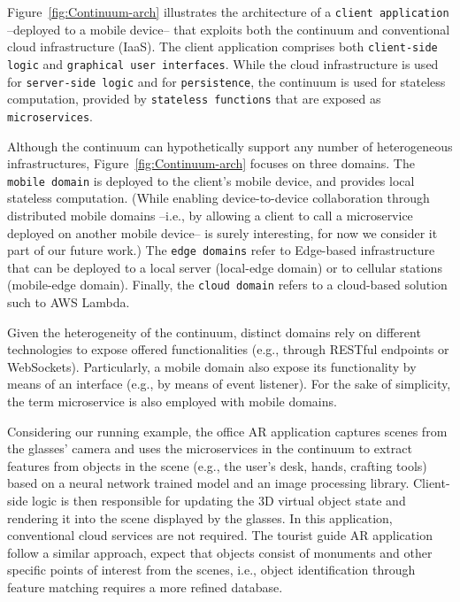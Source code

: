 Figure~\ref{fig:Continuum-arch} illustrates the architecture of a \texttt{client application} --deployed to a mobile device-- that exploits both the continuum and conventional cloud infrastructure (IaaS). The client application comprises both \texttt{client-side logic} and \texttt{graphical user interfaces}. While the cloud infrastructure is used for \texttt{server-side logic} and for \texttt{persistence}, the continuum is used for stateless computation, provided by \texttt{stateless functions} that are exposed as \texttt{microservices}.

Although the continuum can hypothetically support any number of heterogeneous infrastructures, Figure~\ref{fig:Continuum-arch} focuses on three domains. The \texttt{mobile domain} is deployed to the client's mobile device, and provides local stateless computation. (While enabling device-to-device collaboration through distributed mobile domains --i.e., by allowing a client to call a microservice deployed on another mobile device-- is surely interesting, for now we consider it part of our future work.) The \texttt{edge domains} refer to Edge-based infrastructure that can be deployed to a local server (local-edge domain) or to cellular stations (mobile-edge domain). Finally, the \texttt{cloud domain} refers to a cloud-based solution such to AWS Lambda.

Given the heterogeneity of the continuum, distinct domains rely on different technologies to expose offered functionalities (e.g., through RESTful endpoints or WebSockets). Particularly, a mobile domain also expose its functionality by means of an interface (e.g., by means of event listener). For the sake of simplicity, the term microservice is also employed with mobile domains.

Considering our running example, the office AR application captures scenes from the glasses' camera and uses the microservices in the continuum to extract features from objects in the scene (e.g., the user's desk, hands, crafting tools) based on a neural network trained model and an image processing library. Client-side logic is then responsible for updating the 3D virtual object state and rendering it into the scene displayed by the glasses. In this application, conventional cloud services are not required. The tourist guide AR application follow a similar approach, expect that objects consist of monuments and other specific points of interest from the scenes, i.e., object identification through feature matching requires a more refined database.
 
